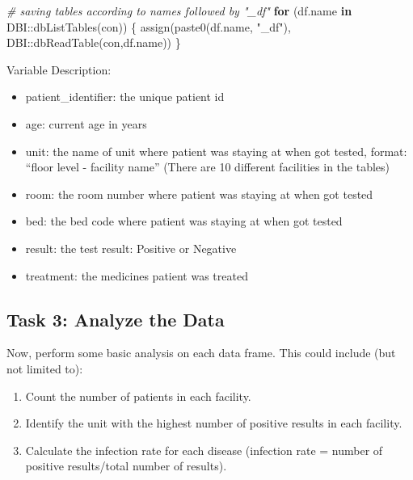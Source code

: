 \documentclass[
]{article}
\newenvironment{Shaded}{\begin{snugshade}}{\end{snugshade}}
\newcommand{\CommentTok}[1]{\textcolor[rgb]{0.56,0.35,0.01}{\textit{#1}}}
\newcommand{\ControlFlowTok}[1]{\textcolor[rgb]{0.13,0.29,0.53}{\textbf{#1}}}
\newcommand{\FunctionTok}[1]{\textcolor[rgb]{0.00,0.00,0.00}{#1}}
\newcommand{\NormalTok}[1]{#1}
\newcommand{\SpecialCharTok}[1]{\textcolor[rgb]{0.00,0.00,0.00}{#1}}
\newcommand{\StringTok}[1]{\textcolor[rgb]{0.31,0.60,0.02}{#1}}
\providecommand{\tightlist}{%
  \setlength{\itemsep}{0pt}\setlength{\parskip}{0pt}}
\begin{document}
\begin{Shaded}
\begin{Highlighting}[]
\CommentTok{\# saving tables according to names followed by "\_df"}
\ControlFlowTok{for}\NormalTok{ (df.name }\ControlFlowTok{in}\NormalTok{ DBI}\SpecialCharTok{::}\FunctionTok{dbListTables}\NormalTok{(con)) \{}
  \FunctionTok{assign}\NormalTok{(}\FunctionTok{paste0}\NormalTok{(df.name, }\StringTok{"\_df"}\NormalTok{),}
\NormalTok{         DBI}\SpecialCharTok{::}\FunctionTok{dbReadTable}\NormalTok{(con,df.name))}
\NormalTok{\}}
\end{Highlighting}
\end{Shaded}

Variable Description:

\begin{itemize}
\tightlist
\item
  patient\_identifier: the unique patient id
\item
  age: current age in years
\item
  unit: the name of unit where patient was staying at when got tested,
  format: ``floor level - facility name'' (There are 10 different
  facilities in the tables)
\item
  room: the room number where patient was staying at when got tested
\item
  bed: the bed code where patient was staying at when got tested
\item
  result: the test result: Positive or Negative
\item
  treatment: the medicines patient was treated
\end{itemize}

\hypertarget{task-3-analyze-the-data}{%
\subsection{Task 3: Analyze the Data}\label{task-3-analyze-the-data}}

Now, perform some basic analysis on each data frame. This could include
(but not limited to):

\begin{enumerate}
\def\labelenumi{\arabic{enumi}.}
\tightlist
\item
  Count the number of patients in each facility.
\item
  Identify the unit with the highest number of positive results in each
  facility.
\item
  Calculate the infection rate for each disease (infection rate = number
  of positive results/total number of results).
\end{enumerate}
\end{document}
